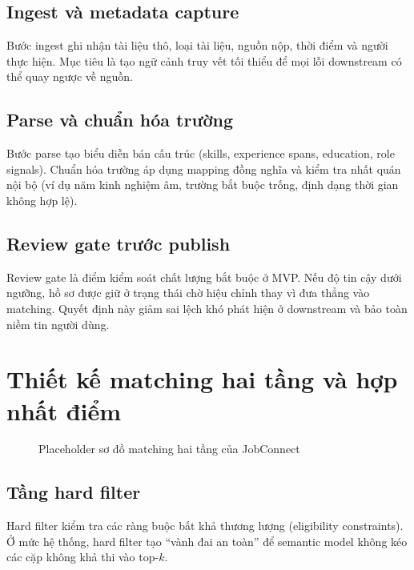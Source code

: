 \subsection{Ingest và metadata capture}

Bước ingest ghi nhận tài liệu thô, loại tài liệu, nguồn nộp, thời điểm và người thực hiện. Mục tiêu là tạo ngữ cảnh truy vết tối thiểu để mọi lỗi downstream có thể quay ngược về nguồn.

\subsection{Parse và chuẩn hóa trường}

Bước parse tạo biểu diễn bán cấu trúc (skills, experience spans, education, role signals). Chuẩn hóa trường áp dụng mapping đồng nghĩa và kiểm tra nhất quán nội bộ (ví dụ năm kinh nghiệm âm, trường bắt buộc trống, định dạng thời gian không hợp lệ).

\subsection{Review gate trước publish}

Review gate là điểm kiểm soát chất lượng bắt buộc ở MVP. Nếu độ tin cậy dưới ngưỡng, hồ sơ được giữ ở trạng thái chờ hiệu chỉnh thay vì đưa thẳng vào matching. Quyết định này giảm sai lệch khó phát hiện ở downstream và bảo toàn niềm tin người dùng.

\section{Thiết kế matching hai tầng và hợp nhất điểm}

\begin{figure}[H]
\centering
{}
\caption{Placeholder sơ đồ matching hai tầng của JobConnect}
\label{fig:two-stage-matching-placeholder}
\end{figure}

\subsection{Tầng hard filter}

Hard filter kiểm tra các ràng buộc bất khả thương lượng (eligibility constraints). Ở mức hệ thống, hard filter tạo ``vành đai an toàn'' để semantic model không kéo các cặp không khả thi vào top-$k$.

